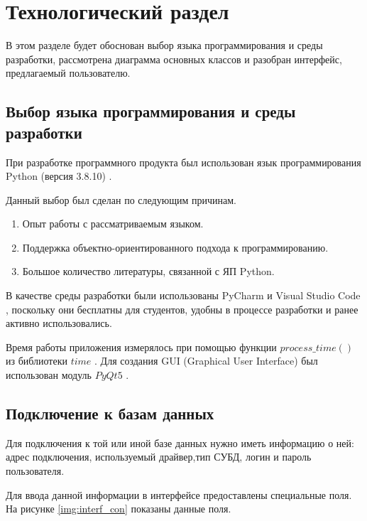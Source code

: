\chapter{Технологический раздел}

В этом разделе будет обоснован выбор языка программирования и среды разработки, рассмотрена диаграмма основных классов и разобран интерфейс, предлагаемый пользователю.

\section{Выбор языка программирования и среды разработки}
При разработке программного продукта был использован язык программирования Python (версия 3.8.10) \cite{pythonlang}.

Данный выбор был сделан по следующим причинам.
\begin{enumerate}
	\item Опыт работы с рассматриваемым языком.
	\item Поддержка объектно-ориентированного подхода к программированию.
	\item Большое количество литературы, связанной с ЯП Python.
\end{enumerate}

В качестве среды разработки были использованы PyCharm \cite{pycharm} и Visual Studio Code \cite{vcode}, поскольку они бесплатны для студентов, удобны в процессе разработки и ранее активно использовались.

Время работы приложения измерялось при помощью функции \newline $process\_time()$ из библиотеки $time$ \cite{pythonlangtime}. Для создания GUI (Graphical User Interface) был использован модуль $PyQt5$ \cite{pyqt5}.

\section{Подключение к базам данных}

Для подключения к той или иной базе данных нужно иметь информацию о ней: адрес подключения, используемый драйвер,тип СУБД, логин и пароль пользователя.

Для ввода данной информации в интерфейсе предоставлены специальные поля. На рисунке \ref{img:interf_con} показаны данные поля.

